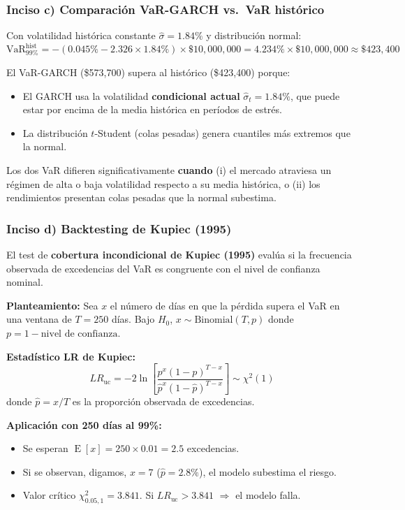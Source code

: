 \documentclass[12pt,a4paper]{article}
\DeclareMathOperator{\E}{E}
\begin{document}
\subsubsection*{Inciso c) Comparación VaR-GARCH vs.\ VaR histórico}

\begin{solucion}
Con volatilidad histórica constante $\hat{\sigma}=1.84\%$ y distribución normal:
\begin{equation}
\text{VaR}_{99\%}^{\text{hist}} = -(0.045\%-2.326\times1.84\%)\times\$10{,}000{,}000 = 4.234\%\times\$10{,}000{,}000\approx\$423{,}400
\end{equation}

El VaR-GARCH (\$573{,}700) supera al histórico (\$423{,}400) porque:
\begin{itemize}[noitemsep]
  \item El GARCH usa la volatilidad \textbf{condicional actual} $\hat{\sigma}_t=1.84\%$, que puede estar por encima de la media histórica en períodos de estrés.
  \item La distribución $t$-Student (colas pesadas) genera cuantiles más extremos que la normal.
\end{itemize}
Los dos VaR difieren significativamente \textbf{cuando} (i) el mercado atraviesa un régimen de alta o baja volatilidad respecto a su media histórica, o (ii) los rendimientos presentan colas pesadas que la normal subestima.
\end{solucion}

\subsubsection*{Inciso d) Backtesting de Kupiec (1995)}

\begin{solucion}
El test de \textbf{cobertura incondicional de Kupiec (1995)} evalúa si la frecuencia observada de excedencias del VaR es congruente con el nivel de confianza nominal.

\textbf{Planteamiento:} Sea $x$ el número de días en que la pérdida supera el VaR en una ventana de $T=250$ días. Bajo $H_0$, $x\sim\text{Binomial}(T,p)$ donde $p=1-\text{nivel de confianza}$.

\textbf{Estadístico LR de Kupiec:}
\begin{equation}
LR_{\text{uc}} = -2\ln\left[\frac{p^x(1-p)^{T-x}}{\hat{p}^x(1-\hat{p})^{T-x}}\right] \sim \chi^2(1)
\end{equation}
donde $\hat{p}=x/T$ es la proporción observada de excedencias.

\textbf{Aplicación con 250 días al 99\%:}
\begin{itemize}[noitemsep]
  \item Se esperan $\E[x]=250\times0.01=2.5$ excedencias.
  \item Si se observan, digamos, $x=7$ ($\hat{p}=2.8\%$), el modelo subestima el riesgo.
  \item Valor crítico $\chi^2_{0.05,1}=3.841$. Si $LR_{\text{uc}}>3.841$ $\Rightarrow$ el modelo falla.
\end{itemize}
\end{solucion}
\end{document}
